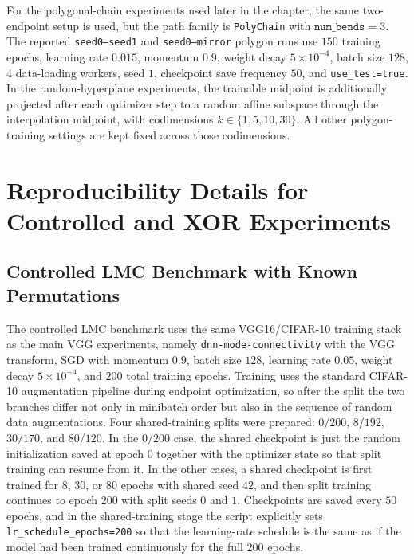 \documentclass[11pt,a4paper]{report}
\begin{document}
For the polygonal-chain experiments used later in the chapter, the same two-endpoint setup is used, but the path family is \texttt{PolyChain} with \(\texttt{num\_bends}=3\). The reported \texttt{seed0--seed1} and \texttt{seed0--mirror} polygon runs use \(150\) training epochs, learning rate \(0.015\), momentum \(0.9\), weight decay \(5\times 10^{-4}\), batch size \(128\), \(4\) data-loading workers, seed \(1\), checkpoint save frequency \(50\), and \texttt{use\_test=true}. In the random-hyperplane experiments, the trainable midpoint is additionally projected after each optimizer step to a random affine subspace through the interpolation midpoint, with codimensions \(k\in\{1,5,10,30\}\). All other polygon-training settings are kept fixed across those codimensions.

\section{Reproducibility Details for Controlled and XOR Experiments}
\label{app:controlled_xor_repro}

\subsection{Controlled LMC Benchmark with Known Permutations}

The controlled LMC benchmark uses the same VGG16/CIFAR-10 training stack as the main VGG experiments, namely \texttt{dnn-mode-connectivity} with the VGG transform, SGD with momentum \(0.9\), batch size \(128\), learning rate \(0.05\), weight decay \(5\times 10^{-4}\), and \(200\) total training epochs. Training uses the standard CIFAR-10 augmentation pipeline during endpoint optimization, so after the split the two branches differ not only in minibatch order but also in the sequence of random data augmentations. Four shared-training splits were prepared: \(0/200\), \(8/192\), \(30/170\), and \(80/120\). In the \(0/200\) case, the shared checkpoint is just the random initialization saved at epoch \(0\) together with the optimizer state so that split training can resume from it. In the other cases, a shared checkpoint is first trained for \(8\), \(30\), or \(80\) epochs with shared seed \(42\), and then split training continues to epoch \(200\) with split seeds \(0\) and \(1\). Checkpoints are saved every \(50\) epochs, and in the shared-training stage the script explicitly sets \texttt{lr\_schedule\_epochs=200} so that the learning-rate schedule is the same as if the model had been trained continuously for the full \(200\) epochs.
\end{document}
